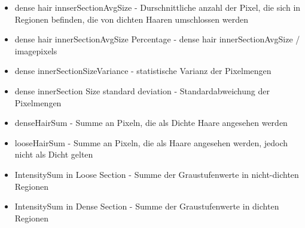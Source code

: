 \documentclass[german,a4paper, 12pt]{scrartcl}
\begin{document}
\begin{itemize}
	\item dense hair innserSectionAvgSize - Durschnittliche anzahl der Pixel, die sich in Regionen befinden, die von dichten Haaren umschlossen werden
	\item dense hair innerSectionAvgSize Percentage - dense hair innerSectionAvgSize / imagepixels
	\item dense innerSectionSizeVariance - statistische Varianz der Pixelmengen
	\item dense innerSection Size standard deviation - Standardabweichung der Pixelmengen
	\item denseHairSum - Summe an Pixeln, die als Dichte Haare angesehen werden
	\item looseHairSum - Summe an Pixeln, die als Haare angesehen werden, jedoch nicht als Dicht gelten
	\item IntensitySum in Loose Section - Summe der Graustufenwerte in nicht-dichten Regionen
	\item IntensitySum in Dense Section - Summe der Graustufenwerte in dichten Regionen
\end{itemize}
\end{document}
